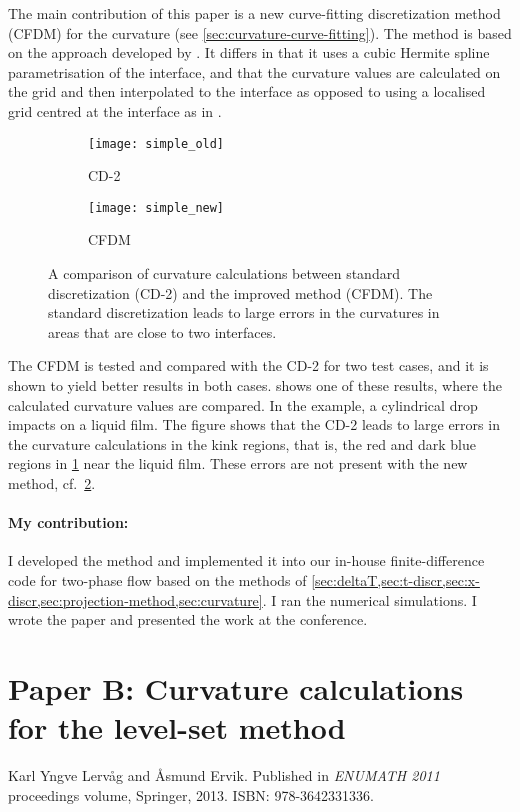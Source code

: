 \documentclass[11pt,b5paper,DIV=calc,BCOR1.3cm,headings=small,%
               footinclude=false,headsepline]{scrbook}
\begin{document}
The main contribution of this paper is a new curve-fitting discretization
method (CFDM) for the curvature (see \cref{sec:curvature-curve-fitting}).  The
method is based on the approach developed by \citet{Macklin06}.  It differs in
that it uses a cubic Hermite spline parametrisation of the interface, and that
the curvature values are calculated on the grid and then interpolated to the
interface as opposed to using a localised grid centred at the interface as in
\cite{Macklin06}.

\begin{figure}[tbp]
  \centering
  \begin{subfigure}[t]{0.47\textwidth}
    \centering
    \texttt{[image: simple\_old]}
    \caption{CD-2}
    \label{fig:A1a}
  \end{subfigure}
  \begin{subfigure}[t]{0.47\textwidth}
    \centering
    \texttt{[image: simple\_new]}
    \caption{CFDM}
    \label{fig:A1b}
  \end{subfigure}
  \caption{A comparison of curvature calculations between standard
    discretization (CD-2) and the improved method (CFDM).  The standard
    discretization leads to large errors in the curvatures in areas that are
    close to two interfaces.}
  \label{fig:A1}
\end{figure}

The CFDM is tested and compared with the CD-2 for two test cases, and it is
shown to yield better results in both cases.   shows one of these
results, where the calculated curvature values are compared.  In the example,
a cylindrical drop impacts on a liquid film.  The figure shows that the CD-2
leads to large errors in the curvature calculations in the kink regions, that
is, the red and dark blue regions in \cref{fig:A1a} near the liquid film.
These errors are not present with the new method, cf.\ \cref{fig:A1b}.

\paragraph{My contribution:}  I developed the method and implemented it into
our in-house finite-difference code for two-phase flow based on the methods of
\cref{sec:deltaT,sec:t-discr,sec:x-discr,sec:projection-method,sec:curvature}.
I ran the numerical simulations.  I wrote the paper and presented the work at
the conference.

\section[Paper B]{Paper B:  Curvature calculations for the level-set method}
Karl Yngve Lervåg and Åsmund Ervik.  Published in \emph{ENUMATH 2011}
proceedings volume, Springer, 2013.  ISBN: 978-3642331336.
\end{document}
